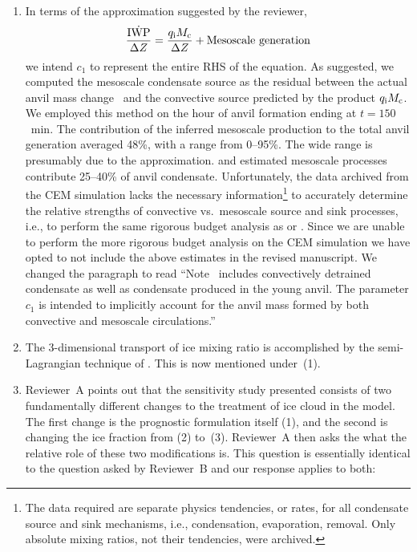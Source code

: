\documentclass[12pt,twoside]{article}
\begin{document}
\begin{enumerate}
\item In terms of the approximation suggested by the reviewer,
$$
{\mbox{$\dot {\mbox{\textrm{IWP}}}$\/} \over \Delta Z} = {\mbox{$q_\mathrm{i}$} \mbox{$M_\mathrm{c}$} \over \Delta Z} +
\mathrm{Mesoscale~generation}
$$
we intend $c_1$ to represent the entire RHS of the equation.
As suggested, we computed the mesoscale condensate source as the
residual between the actual anvil mass change \IWPdot\ and the
convective source predicted by the product $\mbox{$q_\mathrm{i}$}\mbox{$M_\mathrm{c}$}$.
We employed this method on the hour of anvil formation ending at
$t = 150$~min.
The contribution of the inferred mesoscale production to the 
total anvil generation averaged 48\%, with a range from 0--95\%.  
The wide range is presumably due to the approximation.  
\cite{LeH80} and \cite{GaH83} estimated mesoscale processes
contribute 25--40\% of anvil condensate. 
Unfortunately, the data archived from the CEM simulation lacks
the necessary information\footnote{The data required are separate
physics tendencies, or rates, for all condensate source and sink
mechanisms, i.e., condensation, evaporation, removal.
Only absolute mixing ratios, not their tendencies, were archived.} 
to accurately determine the relative strengths of convective vs.\
mesoscale source and sink processes, i.e., to perform the same
rigorous budget analysis as \cite{LeH80} or \cite{SLT94}.
Since we are unable to perform the more rigorous budget analysis 
on the CEM simulation we have opted to not include the above estimates
in the revised manuscript. 
We changed the paragraph to read 
``Note \IWPdot\ includes convectively detrained condensate as well as
condensate produced in the young anvil.
The parameter $c_1$ is intended to implicitly account for the anvil
mass formed by both convective and mesoscale circulations.''  

\item The 3-dimensional transport of ice mixing ratio is accomplished 
by the semi-Lagrangian technique of \cite{WiR93}. 
This is now mentioned under~(1).

\item Reviewer~A points out that the sensitivity study presented
consists of two fundamentally different changes to the treatment of
ice cloud in the model.
The first change is the prognostic formulation itself (1), and the
second is changing the ice fraction from (2) to~(3).
Reviewer~A then asks the what the relative role of these two
modifications is.   
This question is essentially identical to the question asked by
Reviewer~B and our response applies to both:
 

\end{enumerate}
\end{document}
